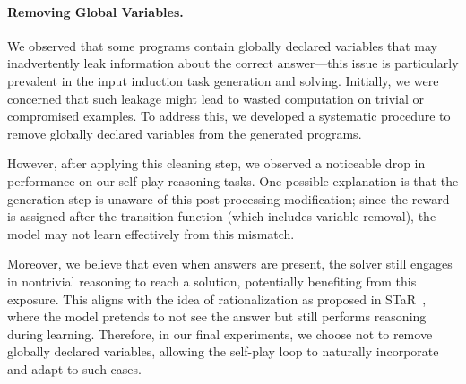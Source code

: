 \documentclass{article}
\begin{document}
\paragraph{Removing Global Variables.}
We observed that some programs contain globally declared variables that may inadvertently leak information about the correct answer—this issue is particularly prevalent in the input induction task generation and solving. Initially, we were concerned that such leakage might lead to wasted computation on trivial or compromised examples. To address this, we developed a systematic procedure to remove globally declared variables from the generated programs.

However, after applying this cleaning step, we observed a noticeable drop in performance on our self-play reasoning tasks. One possible explanation is that the generation step is unaware of this post-processing modification; since the reward is assigned after the transition function (which includes variable removal), the model may not learn effectively from this mismatch.

Moreover, we believe that even when answers are present, the solver still engages in nontrivial reasoning to reach a solution, potentially benefiting from this exposure. This aligns with the idea of rationalization as proposed in STaR~\citep{zelikman2022star}, where the model pretends to not see the answer but still performs reasoning during learning. Therefore, in our final experiments, we choose not to remove globally declared variables, allowing the self-play loop to naturally incorporate and adapt to such cases.

\end{document}
